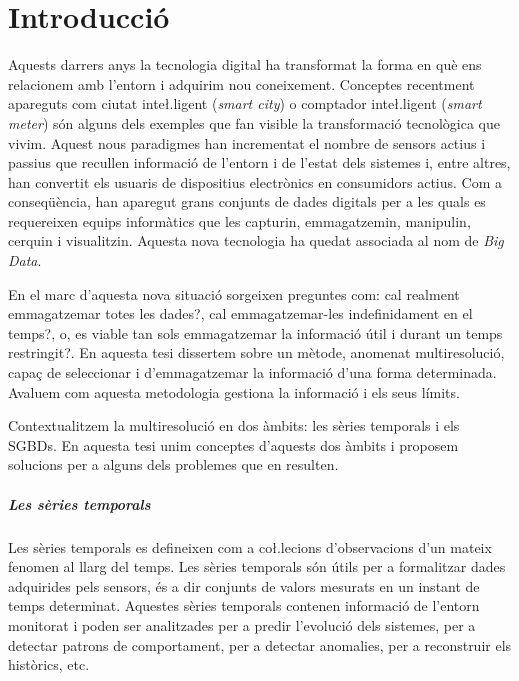 

\chapter{Introducció}
\label{sec:intro}

Aquests darrers anys la tecnologia digital ha transformat la forma en
què ens relacionem amb l’entorn i adquirim nou coneixement. Conceptes
recentment apareguts com ciutat inte\l.ligent (\emph{smart city}) o
comptador inte\l.ligent (\emph{smart meter}) són alguns dels exemples
que fan visible la transformació tecnològica que vivim.  Aquest nous
paradigmes han incrementat el nombre de sensors actius i passius que
recullen informació de l’entorn i de l’estat dels sistemes i, entre
altres, han convertit els usuaris de dispositius electrònics en
consumidors actius. Com a conseqüència, han aparegut grans conjunts de
dades digitals per a les quals es requereixen equips informàtics que
les capturin, emmagatzemin, manipulin, cerquin i visualitzin. Aquesta
nova tecnologia ha quedat associada al nom de \emph{Big Data}.

En el marc d'aquesta nova situació sorgeixen preguntes com: cal
realment emmagatzemar totes les dades?, cal emmagatzemar-les
indefinidament en el temps?, o, es viable tan sols emmagatzemar la
informació útil i durant un temps restringit?. En aquesta tesi
dissertem sobre un mètode, anomenat multiresolució, capaç de
seleccionar i d'emmagatzemar la informació d'una forma
determinada. Avaluem com aquesta metodologia gestiona la informació i
els seus límits.


Contextualitzem la multiresolució en dos àmbits: les sèries temporals
i els \glspl{SGBD}. En aquesta tesi unim conceptes d'aquests dos àmbits
i proposem solucions per a alguns dels problemes que en resulten.



\paragraph{Les sèries temporals}
Les sèries temporals es defineixen com a co\l.lecions d'observacions
d'un mateix fenomen al llarg del temps.  Les sèries temporals són
útils per a formalitzar dades adquirides pels sensors, és
a dir conjunts de valors mesurats en un instant de temps
determinat. Aquestes sèries temporals contenen informació de l'entorn
monitorat i poden ser analitzades per a predir l'evolució dels
sistemes, per a detectar patrons de comportament, per a detectar
anomalies, per a reconstruir els històrics, etc.


